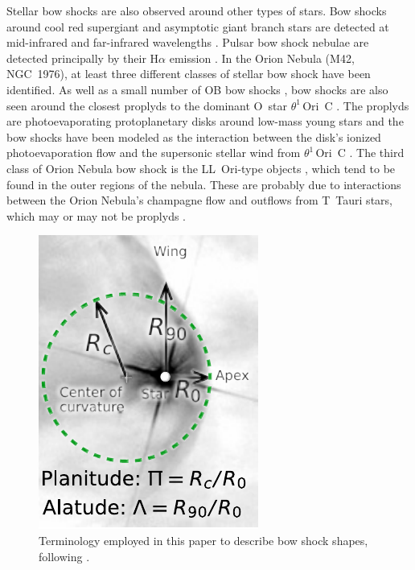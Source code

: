 \documentclass[useAMS, usenatbib, a4paper]{mnras}
\newcommand{\thC}{\(\theta^1\)\,Ori~C}
\begin{document}
Stellar bow shocks are also observed around other types of stars. Bow
shocks around cool red supergiant and asymptotic giant branch stars
are detected at mid-infrared and far-infrared wavelengths
\citep{Ueta:2006a, Ueta:2008a, Sahai:2010a, Cox:2012a}.  Pulsar bow
shock nebulae are detected principally by their H\(\alpha\) emission
\citep{Kulkarni:1988a, Brownsberger:2014a}.  In the Orion Nebula (M42,
NGC~1976), at least three different classes of stellar bow shock have
been identified. As well as a small number of OB bow shocks
\citep{Smith:2005a, ODell:2001c}, bow shocks are also seen around the
closest proplyds to the dominant O~star \thC{} \citep{Hayward:1994a,
  Bally:1998a, Robberto:2005a}.  The proplyds \citep{ODell:2008b} are
photoevaporating protoplanetary disks around low-mass young stars
\citep{Johnstone:1998a} and the bow shocks have been modeled as the
interaction between the disk's ionized photoevaporation flow and the
supersonic stellar wind from \thC{} \citep{Garcia-Arredondo:2001a}.
The third class of Orion Nebula bow shock is the LL~Ori-type objects
\citetext{\citealp{Gull:1979a}; \S~5 of \citealp{Bally:2000a}; \S~3.2
  of \citealp{Bally:2001a}; \citealp{Henney:2013a}}, which tend to be
found in the outer regions of the nebula.  These are probably due to
interactions between the Orion Nebula's champagne flow
\citep{Zuckerman:1973a} and outflows from T~Tauri stars, which may or
may not be proplyds \citep{Bally:2000a, Gutierrez-Soto:2015a}.

\begin{figure}
  \centering
  \includegraphics[width=0.6\linewidth]{figs/obs-shape-terminology}
  \caption[Terminology]{Terminology employed in this paper to describe
    bow shock shapes, following \citet[Paper~0]{Tarango-Yong:2018a}.}
  \label{fig:obs-shape-terminology}
\end{figure}
\end{document}
